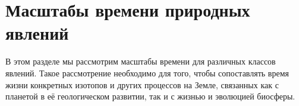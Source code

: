 \documentclass[a5paper,openany]{book}
\begin{document}

	\section{Масштабы времени природных явлений} \label{TimeScales}
	
	В этом разделе мы рассмотрим масштабы времени для различных классов явлений.
	Такое рассмотрение необходимо для того, чтобы сопоставлять время жизни конкретных изотопов и других процессов на Земле, связанных как с планетой в её геологическом развитии, так и с жизнью и эволюцией биосферы.
	
\end{document}
